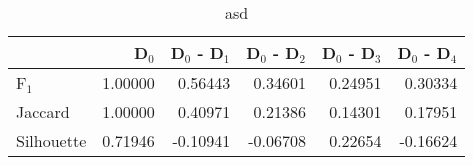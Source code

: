 \begin{table}
\centering
\caption{asd}
\label{tab:s1-cont-total-pivotbi-single}
\begin{tabular}{lrrrrr}
\toprule
{} &   D$_0$ &  D$_0$ - D$_1$ &  D$_0$ - D$_2$ &  D$_0$ - D$_3$ &  D$_0$ - D$_4$ \\
\midrule
F$_1$      & 1.00000 &        0.56443 &        0.34601 &        0.24951 &        0.30334 \\
Jaccard    & 1.00000 &        0.40971 &        0.21386 &        0.14301 &        0.17951 \\
Silhouette & 0.71946 &       -0.10941 &       -0.06708 &        0.22654 &       -0.16624 \\
\bottomrule
\end{tabular}
\end{table}

